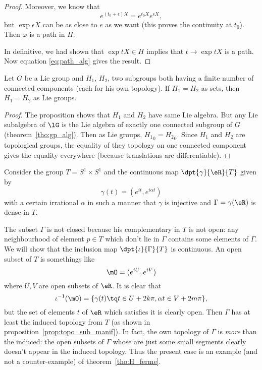 \begin{proof}
Moreover, we know that
\[
  e^{(t_0+\epsilon)X}=e^{t_0X}e^{\epsilon X},
\]
but $\exp \epsilon X$ can be as close to $e$ as we want (this proves the continuity at $t_0$). Then $\varphi$ is a path in $H$.

In definitive, we had shown that $\exp tX\in H$ implies that $t\to\exp tX$ is a path. Now equation \eqref{eq:path_alg} gives the result.
\end{proof}

\begin{corollary}
Let $G$ be a Lie group and $H_1$, $H_2$, two subgroups both having a finite number of connected components (each for his own topology). If $H_1=H_2$ as sets, then $H_1=H_2$ as Lie groups.
\end{corollary}

\begin{proof}
The proposition shows that $H_1$ and $H_2$ have same Lie algebra. But any Lie subalgebra of $\lG$ is the Lie algebra of exactly one connected subgroup of $G$ (theorem~\ref{tho:gp_alg}). Then as Lie groups, ${H_1}_0={H_2}_0$. Since $H_1$ and $H_2$ are topological groups, the equality of they topology on one connected component gives the equality everywhere (because translations are differentiable).
\end{proof}

\label{pg:ex_topo_Lie}
Consider the group $T=S^1\times S^1$ and the continuous map $\dpt{\gamma}{\eR}{T}$ given by
\[
  \gamma(t)=(e^{it},e^{i\alpha t})
\]
with a certain irrational $\alpha$ in such a manner that $\gamma$ is injective and $\Gamma=\gamma(\eR)$ is dense in $T$.

The subset $\Gamma$ is not closed because his complementary in $T$ is not open: any neighbourhood of element $p\in T$ which don't lie in $\Gamma$ contains some elements of $\Gamma$. We will show that the inclusion map $\dpt{\iota}{\Gamma}{T}$ is continuous. An open subset of $T$ is somethings like
\[
  \mO=(e^{iU},e^{iV})
\]
where $U,V$ are open subsets of $\eR$. It is clear that
\[
   \iota^{-1}(\mO)=\{ \gamma(t)\tq t\in U+2k\pi,\alpha t\in V+2m\pi \},
\]
but the set of elements $t$ of $\eR$ which satisfies it is clearly open. Then $\Gamma$ has at least the induced topology from $T$ (as shown in proposition~\ref{prop:topo_sub_manif}). In fact, the own topology of $\Gamma$ is \emph{more} than the induced: the open subsets of $\Gamma$ whose are just some small segments clearly doesn't appear in the induced topology. Thus the present case is an example (and not a counter-example) of theorem~\ref{tho:H_ferme}.

